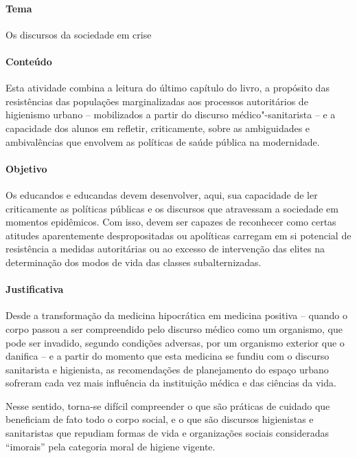 \documentclass[12pt]{extarticle}
\begin{document}
\paragraph{Tema} Os discursos da sociedade em crise

\paragraph{Conteúdo}

Esta atividade combina a leitura do último capítulo do livro, a
propósito das resistências das populações marginalizadas aos processos
autoritários de higienismo urbano -- mobilizados a partir do discurso
médico"-sanitarista -- e a capacidade dos alunos em refletir,
criticamente, sobre as ambiguidades e ambivalências que envolvem as
políticas de saúde pública na modernidade.

\paragraph{Objetivo}

Os educandos e educandas devem desenvolver, aqui, sua capacidade de ler
criticamente as políticas públicas e os discursos que atravessam a
sociedade em momentos epidêmicos. Com isso, devem ser capazes de
reconhecer como certas atitudes aparentemente despropositadas ou
apolíticas carregam em si potencial de resistência a medidas
autoritárias ou ao excesso de intervenção das elites na determinação dos
modos de vida das classes subalternizadas.

\paragraph{Justificativa}

Desde a transformação da medicina hipocrática em medicina positiva --
quando o corpo passou a ser compreendido pelo discurso médico como um
organismo, que pode ser invadido, segundo condições adversas, por um
organismo exterior que o danifica -- e a partir do momento que esta
medicina se fundiu com o discurso sanitarista e higienista, as
recomendações de planejamento do espaço urbano sofreram cada vez mais
influência da instituição médica e das ciências da vida.

Nesse sentido, torna-se difícil compreender o que são práticas de
cuidado que beneficiam de fato todo o corpo social, e o que são
discursos higienistas e sanitaristas que repudiam formas de vida e
organizações sociais consideradas ``imorais'' pela categoria moral de
higiene vigente.
\end{document}
